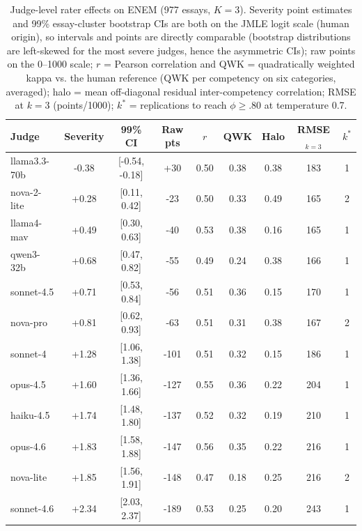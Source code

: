 \begin{table}[t]\centering\caption{Judge-level rater effects on ENEM (977 essays, $K{=}3$). Severity point estimates and 99\% essay-cluster bootstrap CIs are both on the JMLE logit scale (human origin), so intervals and points are directly comparable (bootstrap distributions are left-skewed for the most severe judges, hence the asymmetric CIs); raw points on the 0--1000 scale; $r$ = Pearson correlation and QWK = quadratically weighted kappa vs. the human reference (QWK per competency on six categories, averaged); halo = mean off-diagonal residual inter-competency correlation; RMSE at $k{=}3$ (points/1000); $k^{*}$ = replications to reach $\phi \geq .80$ at temperature 0.7.}
\label{tab:severity}\small\begin{tabular}{lcccccccc}\toprule
Judge & Severity & 99\% CI & Raw pts & $r$ & QWK & Halo & RMSE$_{k=3}$ & $k^{*}$ \\ \midrule
llama3.3-70b & -0.38 & [-0.54, -0.18] & +30 & 0.50 & 0.38 & 0.38 & 183 & 1 \\
nova-2-lite & +0.28 & [0.11, 0.42] & -23 & 0.50 & 0.33 & 0.49 & 165 & 2 \\
llama4-mav & +0.49 & [0.30, 0.63] & -40 & 0.53 & 0.38 & 0.16 & 165 & 1 \\
qwen3-32b & +0.68 & [0.47, 0.82] & -55 & 0.49 & 0.24 & 0.38 & 166 & 1 \\
sonnet-4.5 & +0.71 & [0.53, 0.84] & -56 & 0.51 & 0.36 & 0.15 & 170 & 1 \\
nova-pro & +0.81 & [0.62, 0.93] & -63 & 0.51 & 0.31 & 0.38 & 167 & 2 \\
sonnet-4 & +1.28 & [1.06, 1.38] & -101 & 0.51 & 0.32 & 0.15 & 186 & 1 \\
opus-4.5 & +1.60 & [1.36, 1.66] & -127 & 0.55 & 0.36 & 0.22 & 204 & 1 \\
haiku-4.5 & +1.74 & [1.48, 1.80] & -137 & 0.52 & 0.32 & 0.19 & 210 & 1 \\
opus-4.6 & +1.83 & [1.58, 1.88] & -147 & 0.56 & 0.35 & 0.22 & 216 & 1 \\
nova-lite & +1.85 & [1.56, 1.91] & -148 & 0.47 & 0.18 & 0.25 & 216 & 2 \\
sonnet-4.6 & +2.34 & [2.03, 2.37] & -189 & 0.53 & 0.25 & 0.20 & 243 & 1 \\
\bottomrule\end{tabular}\end{table}

